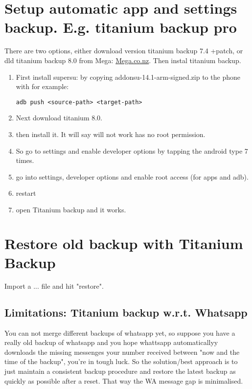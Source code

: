 \section{Setup automatic app and settings backup. E.g. titanium backup pro}\label{sec:tasker_auto_backup}
There are two options, either download version titanium backup 7.4 +patch, or dld titanium backup 8.0 from Mega:  \url{Mega.co.nz}. Then instal titanium backup.

\begin{enumerate}
    \item First install supersu: by copying addonsu-14.1-arm-signed.zip to the phone with for example:
\begin{verbatim}
adb push <source-path> <target-path>    
\end{verbatim}
 
    \item Next download titanium 8.0. 
    \item then install it. It will say will not work has no root permission.
    \item So go to settings and enable developer options by tapping the android type 7 times. 
    \item go into settings, developer options and enable root access (for apps and adb).
    \item restart
    \item open Titanium backup and it works.
    

\end{enumerate}

\section{Restore old backup with Titanium Backup}\label{sec:restore_with_titanium_backup}
Import a  ... file and hit "restore".
\subsection{Limitations: Titanium backup w.r.t. Whatsapp}
You can not merge different backups of whatsapp yet, so suppose you have a really old backup of whatsapp and you hope whattsapp automaticallyy downloads the missing messenges your number received between "now and the time of the backup", you're in tough luck. So the solution/best approach is to just maintain a consistent backup procedure and restore the latest backup as quickly as possible after a reset. That way the WA message gap is minimalised. 


